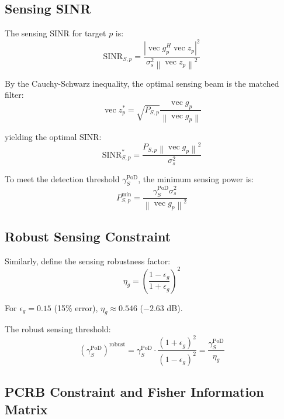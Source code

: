 \documentclass[12pt,a4paper]{article}
\DeclareMathOperator{\vect}{vec}
\newcommand{\norm}[1]{\left\|#1\right\|}
\begin{document}
\subsection{Sensing SINR}

The sensing SINR for target $p$ is:
\begin{equation}
\text{SINR}_{S,p} = \frac{|\vect{g}_p^H \vect{z}_p|^2}{\sigma_s^2 \norm{\vect{z}_p}^2} \tag{5}
\end{equation}

By the Cauchy-Schwarz inequality, the optimal sensing beam is the matched filter:
\begin{equation}
\vect{z}_p^* = \sqrt{P_{S,p}} \frac{\vect{g}_p}{\norm{\vect{g}_p}} \tag{6}
\end{equation}

yielding the optimal SINR:
\begin{equation}
\text{SINR}_{S,p}^* = \frac{P_{S,p} \norm{\vect{g}_p}^2}{\sigma_s^2} \tag{7}
\end{equation}

To meet the detection threshold $\gamma_S^{\text{PoD}}$, the minimum sensing power is:
\begin{equation}
P_{S,p}^{\min} = \frac{\gamma_S^{\text{PoD}} \sigma_s^2}{\norm{\vect{g}_p}^2} \tag{8}
\end{equation}

\subsection{Robust Sensing Constraint}

Similarly, define the sensing robustness factor:
\begin{equation}
\eta_g = \left(\frac{1-\epsilon_g}{1+\epsilon_g}\right)^2 \tag{9}
\end{equation}

For $\epsilon_g = 0.15$ (15\% error), $\eta_g \approx 0.546$ ($-2.63$ dB).

The robust sensing threshold:
\begin{equation}
(\gamma_S^{\text{PoD}})^{\text{robust}} = \gamma_S^{\text{PoD}} \cdot \frac{(1+\epsilon_g)^2}{(1-\epsilon_g)^2} = \frac{\gamma_S^{\text{PoD}}}{\eta_g} \tag{10}
\end{equation}

\subsection{PCRB Constraint and Fisher Information Matrix}
\end{document}
